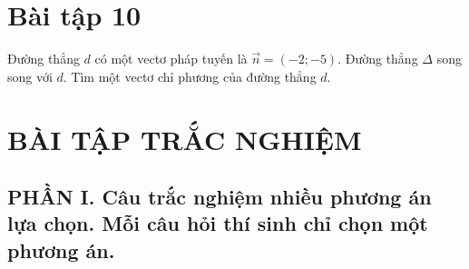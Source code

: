 \documentclass[12pt]{article}
\begin{document}
\section*{Bài tập 10}
Đường thẳng $d$ có một vectơ pháp tuyến là $\vec{n} = (-2; -5)$. Đường thẳng $\Delta$ song song với $d$. Tìm một vectơ chỉ phương của đường thẳng $d$.

\section*{BÀI TẬP TRẮC NGHIỆM}
\subsection*{PHẦN I. Câu trắc nghiệm nhiều phương án lựa chọn. Mỗi câu hỏi thí sinh chỉ chọn một phương án.}
\end{document}
